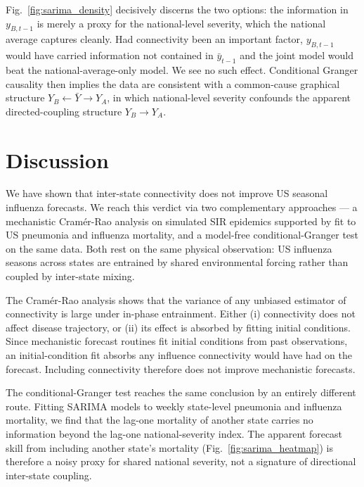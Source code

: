 \documentclass[9pt,twocolumn,twoside]{pnas-new}
\begin{document}
Fig.~\ref{fig:sarima_density} decisively discerns the two options: the
information in $y_{B,t-1}$ is merely a proxy for the national-level
severity, which the national average captures cleanly. Had
connectivity been an important factor, $y_{B,t-1}$ would have carried
information not contained in $\bar y_{t-1}$ and the joint model would
beat the national-average-only model. We see no such
effect. Conditional Granger causality then implies the data are
consistent with a common-cause graphical structure $Y_B \leftarrow
\bar Y \to Y_A$, in which national-level severity confounds the
apparent directed-coupling structure $Y_B \to Y_A$.

\section*{Discussion}
We have shown that inter-state connectivity does not improve US
seasonal influenza forecasts. We reach this verdict via two
complementary approaches --- a mechanistic Cram\'er-Rao analysis on
simulated SIR epidemics supported by fit to US pneumonia and influenza
mortality, and a model-free conditional-Granger test on the same
data. Both rest on the same physical observation: US influenza seasons
across states are entrained by shared environmental forcing rather
than coupled by inter-state mixing.

The Cram\'er-Rao analysis shows that the variance of any unbiased
estimator of connectivity is large under in-phase entrainment. Either
(i) connectivity does not affect disease trajectory, or (ii) its
effect is absorbed by fitting initial conditions. Since mechanistic
forecast routines fit initial conditions from past observations, an
initial-condition fit absorbs any influence connectivity would have
had on the forecast. Including connectivity therefore does not improve
mechanistic forecasts.

The conditional-Granger test reaches the same conclusion by an
entirely different route. Fitting SARIMA models to weekly state-level
pneumonia and influenza mortality, we find that the lag-one mortality
of another state carries no information beyond the lag-one
national-severity index. The apparent forecast skill from including
another state's mortality (Fig.~\ref{fig:sarima_heatmap}) is therefore
a noisy proxy for shared national severity, not a signature of
directional inter-state coupling.
\end{document}
